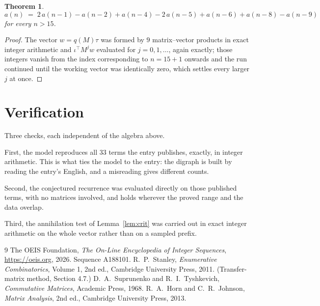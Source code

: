 \documentclass[11pt,a4paper]{article}
\theoremstyle{plain}
\newtheorem{theorem}{Theorem}
\theoremstyle{definition}
\begin{document}
\begin{theorem}
\[
a(n)\;=\;2\,a(n-1) - a(n-2) + a(n-4) - 2\,a(n-5) + a(n-6) + a(n-8) - a(n-9)
\]
for every $n>15$.
\end{theorem}

\begin{proof}
The vector $w=q(M)\tau$ was formed by $9$ matrix--vector products in exact integer
arithmetic and $\iota^{\!\top}M^{j}w$ evaluated for $j=0,1,\dots$, again exactly; those
integers vanish from the index corresponding to $n=15+1$ onwards and the run continued
until the working vector was identically zero, which settles every larger $j$ at once.
\end{proof}

\section{Verification}

Three checks, each independent of the algebra above.

First, the model reproduces all $33$ terms the entry publishes, exactly, in integer
arithmetic. This is what ties the model to the entry: the digraph is built by reading the
entry's English, and a misreading gives different counts.

Second, the conjectured recurrence was evaluated directly on those published terms, with no
matrices involved, and holds wherever the proved range and the data overlap.

Third, the annihilation test of Lemma~\ref{lem:crit} was carried out in exact integer
arithmetic on the whole vector rather than on a sampled prefix.

\begin{thebibliography}{9}
 The OEIS Foundation, \emph{The On-Line Encyclopedia of Integer
Sequences}, \url{https://oeis.org}, 2026. Sequence A188101.
 R.~P.~Stanley, \emph{Enumerative Combinatorics}, Volume 1, 2nd ed.,
Cambridge University Press, 2011. (Transfer-matrix method, Section 4.7.)
 D.~A.~Suprunenko and R.~I.~Tyshkevich, \emph{Commutative Matrices},
Academic Press, 1968.
 R.~A.~Horn and C.~R.~Johnson, \emph{Matrix Analysis}, 2nd ed., Cambridge
University Press, 2013.
\end{thebibliography}
\end{document}
